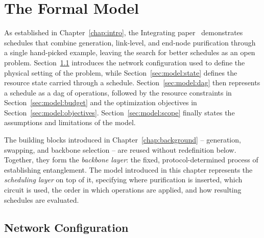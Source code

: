 \chapter{The Formal Model}
\label{chap:model}



As established in Chapter~\ref{chap:intro}, the Integrating paper~\cite{Benchasattabuse2025Integrating} demonstrates schedules that combine generation, link-level, and end-node purification through a single hand-picked example, leaving the search for better schedules as an open problem. Section~\ref{sec:model:network} introduces the network configuration used to define the physical setting of the problem, while Section~\ref{sec:model:state} defines the resource state carried through a schedule. Section~\ref{sec:model:dag} then represents a schedule as a \Gls{dag} of operations, followed by the resource constraints in Section~\ref{sec:model:budget} and the optimization objectives in Section~\ref{sec:model:objectives}. Section~\ref{sec:model:scope} finally states the assumptions and limitations of the model.

The building blocks introduced in Chapter~\ref{chap:background} -- generation, swapping, and backbone selection -- are reused without redefinition below. Together, they form the \emph{backbone layer}: the fixed, protocol-determined process of establishing entanglement. The model introduced in this chapter represents the \emph{scheduling layer} on top of it, specifying where purification is inserted, which circuit is used, the order in which operations are applied, and how resulting schedules are evaluated.

\section{Network Configuration}
\label{sec:model:network}


